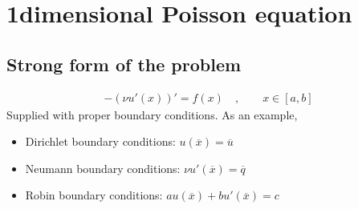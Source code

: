 \documentclass[letterpaper,10pt,english]{jupyterBook}
\begin{document}
\sphinxstepscope


\section{1\sphinxhyphen{}dimensional Poisson equation}
\label{\detokenize{ch/pde/fem-poisson-1d:dimensional-poisson-equation}}\label{\detokenize{ch/pde/fem-poisson-1d:pde-fem-poisson-1d}}\label{\detokenize{ch/pde/fem-poisson-1d::doc}}

\subsection{Strong form of the problem}
\label{\detokenize{ch/pde/fem-poisson-1d:strong-form-of-the-problem}}\begin{equation*}
\begin{split}
  -\left( \nu u'(x) \right)' = f(x) \quad , \qquad x \in [a, b] 
\end{split}
\end{equation*}
\sphinxAtStartPar
Supplied with proper boundary conditions. As an example,
\begin{itemize}
\item {} 
\sphinxAtStartPar
Dirichlet boundary conditions: \(u(\overline{x}) = \overline{u}\)

\item {} 
\sphinxAtStartPar
Neumann boundary conditions: \(\nu u'(\overline{x}) = \overline{q}\)

\item {} 
\sphinxAtStartPar
Robin boundary conditions: \(a u(\overline{x}) + b u'(\overline{x}) = c\)

\end{itemize}
\end{document}
